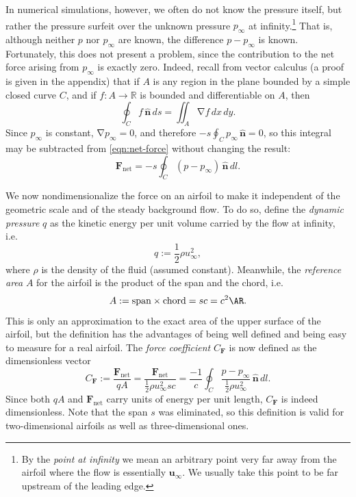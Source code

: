 \documentclass[10pt,fleqn,reqno]{article}
\newcommand\ie{i.e.~}
\newcommand\defn[1]{\emph{#1}}
\DeclareMathOperator\Grad{\nabla}
\begin{document}
In numerical simulations, however, we often do not know the pressure itself, but rather the pressure surfeit over the unknown pressure $p_\infty$ at infinity.\footnote{By the \defn{point at infinity} we mean an arbitrary point very far away from the airfoil where the flow is essentially $\mathbf u_\infty$.  We usually take this point to be far upstream of the leading edge.}  That is, although neither $p$ nor $p_\infty$ are known, the difference \mbox{$p-p_\infty$} is known.  Fortunately, this does not present a problem, since the contribution to the net force arising from $p_\infty$ is exactly zero.  Indeed, recall from vector calculus (a proof is given in the appendix) that if $A$ is any region in the plane bounded by a simple closed curve $C$, and if $f:A\to\mathbb R$ is bounded and differentiable on $A$, then \[\oint_{C}f\,\hat{\mathbf n}\,ds = \iint_A\Grad f\,dx\,dy.\]  Since $p_\infty$ is constant, $\Grad p_\infty=0$, and therefore $-s\oint_Cp_\infty\,\hat{\mathbf n}=0$, so this integral may be subtracted from \eqref{eqn:net-force} without changing the result:
\begin{equation}\label{eqn:net-force-infty}
\mathbf F_\text{net} = -s\oint_C(p-p_\infty)\,\hat{\mathbf n}\,dl.
\end{equation}

We now nondimensionalize the force on an airfoil to make it independent of the geometric scale and of the steady background flow.  To do so, define the \defn{dynamic pressure} $q$ as the kinetic energy per unit volume carried by the flow at infinity, \ie \[q:=\frac{1}{2}\rho u_\infty^2,\] where $\rho$ is the density of the fluid (assumed constant).  Meanwhile, the \defn{reference area} $A$ for the airfoil is the product of the span and the chord, \ie \[A:=\text{span}\times\text{chord} = sc = c^2\AR.\]  This is only an approximation to the exact area of the upper surface of the airfoil, but the definition has the advantages of being well defined and being easy to measure for a real airfoil.  The \defn{force coefficient} $C_{\mathbf F}$ is now defined as the dimensionless vector 
\begin{equation}\label{eqn:force-coefficient}
C_{\mathbf F}:=\frac{\mathbf F_\text{net}}{qA}=\frac{\mathbf F_\text{net}}{\frac{1}{2}\rho u_\infty^2sc} = \frac{-1}{c}\oint_C\frac{p-p_\infty}{\frac{1}{2}\rho u_\infty^2}\,\hat{\mathbf n}\,dl.
\end{equation}
Since both $qA$ and $\mathbf F_\text{net}$ carry units of energy per unit length, $C_{\mathbf F}$ is indeed dimensionless.  Note that the span $s$ was eliminated, so this definition is valid for two-dimensional airfoils as well as three-dimensional ones.  
\end{document}
